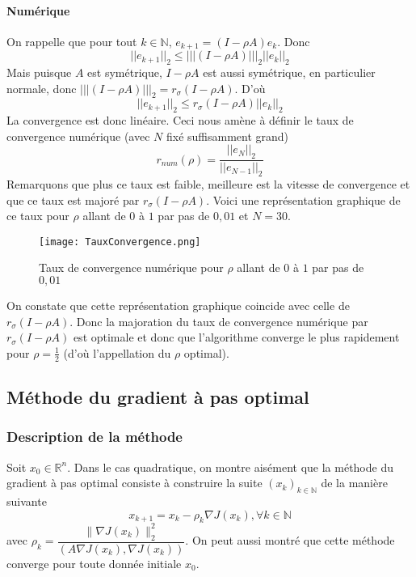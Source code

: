 \documentclass[9pt,a4paper]{article}
\begin{document}
\paragraph{Numérique}
On rappelle que pour tout $k \in \mathbb{N}$, $e_{k+1} = (I - \rho A)e_k$. Donc
$$
||e_{k+1}||_2 \leqslant |||(I - \rho A)|||_2 ||e_k||_2
$$
Mais puisque $A$ est symétrique, $I - \rho A$ est aussi symétrique, en particulier normale, donc $|||(I - \rho A)|||_2 = r_{\sigma}(I - \rho A)$. D'où
$$
||e_{k+1}||_2 \leqslant r_{\sigma}(I - \rho A) ||e_k||_2
$$
La convergence est donc linéaire. Ceci nous amène à définir le taux de convergence numérique (avec $N$ fixé suffisamment grand)
$$
r_{num}(\rho) = \frac{||e_N||_2}{||e_{N-1}||_2}
$$
Remarquons que plus ce taux est faible, meilleure est la vitesse de convergence et que ce taux est majoré par $r_{\sigma}(I - \rho A)$.\newline
Voici une représentation graphique de ce taux pour $\rho$ allant de $0$ à $1$ par pas de $0,01$ et $N = 30$.
\begin{figure}[h]
    \centering
    \texttt{[image: TauxConvergence.png]}
    \caption{Taux de convergence numérique pour $\rho$ allant de $0$ à $1$ par pas de $0,01$}
    \label{fig:enter-label}
\end{figure}\newline
On constate que cette représentation graphique coincide avec celle de $r_{\sigma}(I - \rho A)$. Donc la majoration du taux de convergence numérique par $r_{\sigma}(I - \rho A)$ est optimale et donc que l'algorithme converge le plus rapidement pour $\rho = \frac{1}{2}$ (d'où l'appellation du $\rho$ optimal).
\subsection{Méthode du gradient à pas optimal}
\subsubsection{Description de la méthode}
Soit $x_0 \in \mathbb{R}^n$. Dans le cas quadratique, on montre aisément que la méthode du gradient à pas optimal consiste à construire la suite $(x_k)_{k \in \mathbb{N}}$ de la manière suivante
$$
x_{k+1} = x_k - \rho_k \nabla J(x_k), \forall k \in \mathbb{N}
$$
avec $\rho_k =\dfrac{\lVert \nabla J(x_k)\lVert^2_2}{(A \nabla J(x_k),\nabla J(x_k))}$.\newline
\newline
On peut aussi montré que cette méthode converge pour toute donnée initiale $x_0$.
\end{document}
